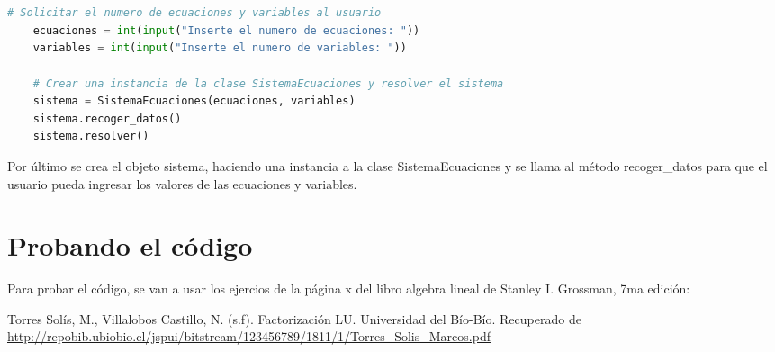 \documentclass[letterpaper,12pt]{article}
\begin{document}
\\\\\begin{lstlisting}[style=jupyter, language=Python, caption={Método para resolver el sistema de ecuaciones}]
    # Solicitar el numero de ecuaciones y variables al usuario
    ecuaciones = int(input("Inserte el numero de ecuaciones: "))
    variables = int(input("Inserte el numero de variables: "))
    
    # Crear una instancia de la clase SistemaEcuaciones y resolver el sistema
    sistema = SistemaEcuaciones(ecuaciones, variables)
    sistema.recoger_datos()
    sistema.resolver()
\end{lstlisting}

Por último se crea el objeto sistema, haciendo una instancia a la clase \textcolor{jl_keyword}{SistemaEcuaciones} y se llama al método \textcolor{jl_keyword}{recoger\_datos} para que el usuario pueda ingresar los valores de las ecuaciones y variables.
\\

\section*{Probando el código}
Para probar el código, se van a usar los ejercios de la página x del libro algebra lineal de Stanley I. Grossman, 7ma edición:

\begin{thebibliography}{99}
Torres Solís, M., Villalobos Castillo, N. (s.f). Factorización LU. Universidad del Bío-Bío. Recuperado de \url{http://repobib.ubiobio.cl/jspui/bitstream/123456789/1811/1/Torres_Solis_Marcos.pdf}
\end{thebibliography}
\end{document}
